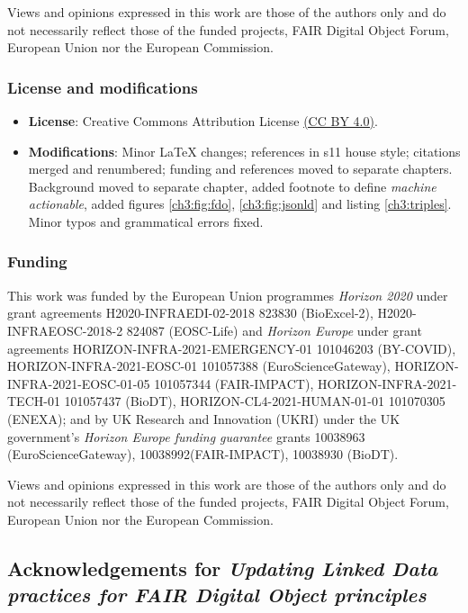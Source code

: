 Views and opinions expressed in this work are those of the authors only and do not necessarily reflect those of the funded projects, FAIR Digital Object Forum, European Union nor the European Commission.

\subsubsection*{License and modifications}

\begin{itemize}
\tightlist
\item
  \textbf{License}: Creative Commons Attribution License
  \href{https://spdx.org/licenses/CC-BY-4.0}{(CC BY 4.0)}.
\item
  \textbf{Modifications}: Minor LaTeX changes; references in s11 house style; 
  citations merged and renumbered; 
  funding and references moved to separate chapters. Background moved to separate chapter, added footnote to define \emph{machine actionable}, added figures \ref{ch3:fig:fdo}, \ref{ch3:fig:jsonld} and listing \ref{ch3:triples}. Minor typos and grammatical errors fixed.
\end{itemize}

\subsubsection*{Funding}

This work was funded by the European Union programmes \emph{Horizon 2020} under grant agreements H2020-INFRAEDI-02-2018 823830 (BioExcel-2), H2020-INFRAEOSC-2018-2 824087 (EOSC-Life) and \emph{Horizon Europe} under grant agreements HORIZON-INFRA-2021-EMERGENCY-01 101046203 (BY-COVID), HORIZON-INFRA-2021-EOSC-01 101057388 (EuroScienceGateway), HORIZON-INFRA-2021-EOSC-01-05 101057344 (FAIR-IMPACT), HORIZON-INFRA-2021-TECH-01 101057437 (BioDT), HORIZON-CL4-2021-HUMAN-01-01 101070305 (ENEXA); and by UK Research and Innovation (UKRI) under the UK government’s \emph{Horizon Europe funding guarantee} grants 10038963 (EuroScienceGateway), 10038992(FAIR-IMPACT), 10038930 (BioDT).

Views and opinions expressed in this work are those of the authors only and do not necessarily reflect those of the funded projects, FAIR Digital Object Forum, European Union nor the European Commission.



\subsection{Acknowledgements for \textit{Updating Linked Data practices for FAIR Digital Object principles}}\label{ch11:updating-ld}


